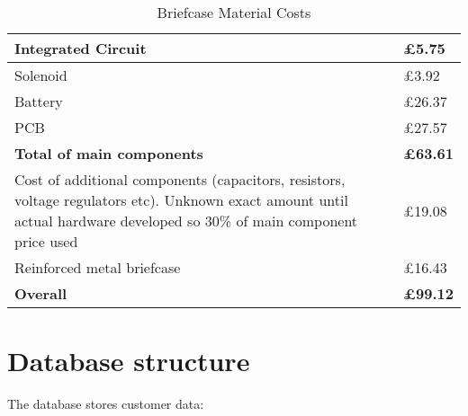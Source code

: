\begin{table}[!htbp]
    \centering
        \begin{tabular}{|p{}|p{}|}
        \hline
        Integrated Circuit \cite{nxpDigikey} & £5.75 \\
        \hline
        Solenoid \cite{solenoidDigikey} & £3.92 \\
        \hline
        Battery \cite{batteryDigikey} & £26.37 \\
        \hline
        PCB \cite{pcbFabrication} & £27.57 \\
        \hline
        \textbf{Total of main components} & \textbf{£63.61} \\
        \hline
        Cost of additional components 
        (capacitors, resistors, voltage regulators etc). 
        Unknown exact amount until actual hardware developed so 
        30\% of main component price used & £19.08 \\
        \hline
        Reinforced metal briefcase \cite{reinforcedBriefcase} & £16.43 \\
        \hline
        \textbf{Overall} & \textbf{£99.12} \\
        \hline
    \end{tabular}
\caption{Briefcase Material Costs}
\label{tab:briefcasematcosts}
\end{table}
\newpage

\section{Database structure}
The database stores customer data:

